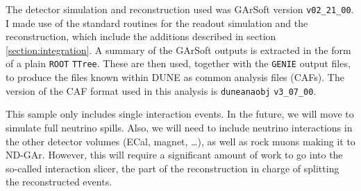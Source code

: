The detector simulation and reconstruction used was GArSoft version \texttt{v02_21_00}. I made use of the standard routines for the readout simulation and the reconstruction, which include the additions described in section \ref{section:integration}. A summary of the GArSoft outputs is extracted in the form of a plain \texttt{ROOT} \texttt{TTree}. These are then used, together with the \texttt{GENIE} output files, to produce the files known within DUNE as common analysis files (CAFs). The version of the CAF format used in this analysis is \texttt{duneanaobj} \texttt{v3_07_00}.

This sample only includes single interaction events. In the future, we will move to simulate full neutrino spills. Also, we will need to include neutrino interactions in the other detector volumes (ECal, magnet, \dots), as well as rock muons making it to ND-GAr. However, this will require a significant amount of work to go into the so-called interaction slicer, the part of the reconstruction in charge of splitting the reconstructed events.


